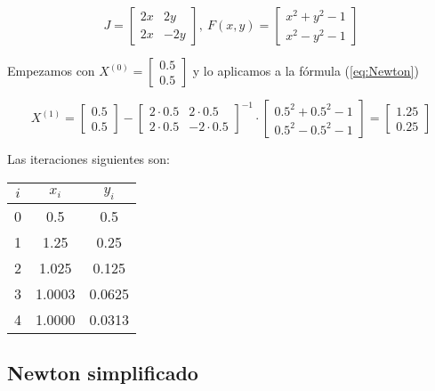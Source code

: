 \documentclass{article}
\begin{document}
\begin{equation*}
    J = \begin{bmatrix}
    2x & 2y \\
    2x & -2y
    \end{bmatrix},\ F(x, y) = \begin{bmatrix}
    x^2 + y^2 - 1 \\
    x^2 - y^2 - 1
    \end{bmatrix}
\end{equation*}

Empezamos con $X^{(0)} = \begin{bmatrix}0.5\\0.5\end{bmatrix}$ y lo aplicamos a 
la fórmula (\ref{eq:Newton})

\begin{equation*}
    X^{(1)} = \begin{bmatrix}0.5\\0.5\end{bmatrix} - \begin{bmatrix}
    2\cdot0.5 & 2\cdot0.5 \\
    2\cdot0.5 & -2\cdot0.5
    \end{bmatrix}^{-1} \cdot \begin{bmatrix}
    0.5^2 + 0.5^2 - 1 \\
    0.5^2 - 0.5^2 - 1
    \end{bmatrix} = \begin{bmatrix}
    1.25 \\ 0.25
    \end{bmatrix}
\end{equation*}

Las iteraciones siguientes son:

\begin{table}[h]
\centering
\begin{tabular}{ccc}
$i$ & $x_i$   & $y_i$   \\\hline
  0 & 0.5     & 0.5     \\
  1 & 1.25    & 0.25    \\
  2 & 1.025   & 0.125   \\
  3 & 1.0003  & 0.0625  \\
  4 & 1.0000  & 0.0313
\end{tabular}
\end{table}

\subsection{Newton simplificado}
\end{document}
